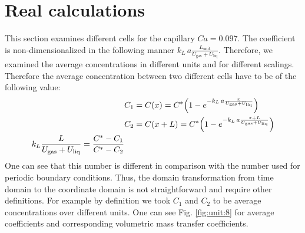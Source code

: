 \documentclass{article}
\newcommand{\beqal}{\begin{equation}\begin{aligned}}
\newcommand{\feqal}{\end{aligned}\end{equation}}
\newcommand{\vol}{k_L\,a}
\newcommand{\lunit}{L_{\mathrm{unit}}}
\newcommand{\uliq}{U_{\mathrm{liq}}}
\newcommand{\ugas}{U_{\mathrm{gas}}}
\begin{document}
\section{Real calculations}
This section examines different cells for the capillary $Ca=0.097$. The coefficient is
non-dimensionalized in the following manner $\vol \frac{\lunit}{\ugas+\uliq}$. Therefore, we
examined the average concentrations in different units and for different scalings. Therefore the
average concentration between two different cells have to be of the following value:
\beqal
&C_1=C(x)=C^* \Bigl(1-e^{-\vol \frac{x}{\ugas+\uliq}}\Bigr)\\
&C_2=C(x+L)=C^* \Bigl(1-e^{-\vol \frac{x+L}{\ugas+\uliq}}\Bigr)\\
k_L\frac{L}{\ugas+\uliq}=\frac{C^*-C_1}{C^{*}-C_2}
\feqal
One can see that this number is different in comparison with the number used for periodic boundary
conditions. Thus, the domain transformation from time domain to the coordinate domain is not
straightforward and require other definitions. For example by definition we took $C_1$ and $C_2$ to
be average concentrations over different units. One can see Fig. \ref{fig:unit:8} for
average coefficients and corresponding volumetric mass transfer coefficients.
\end{document}
